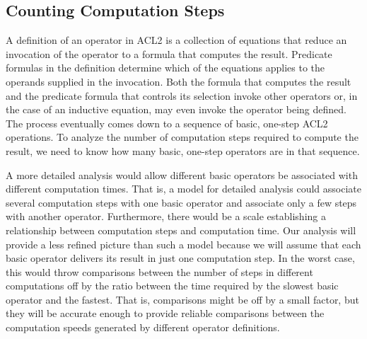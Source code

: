 \subsection{Counting Computation Steps}
\label{subsec:counting-computation-steps}

A definition of an operator in ACL2
is a collection of equations that
reduce an invocation of the operator
to a formula that computes the result.
Predicate formulas in the definition determine
which of the equations applies to
the operands supplied in the invocation.
Both the formula that computes the result and
the predicate formula that controls
its selection invoke other operators
or, in the case of an inductive equation,
may even invoke the operator being defined.
The process eventually comes down to a sequence
of basic, one-step ACL2 operations.
To analyze the number of computation steps
required to compute the result,
we need to know how many basic, one-step operators are
in that sequence.

A more detailed analysis would allow different
basic operators be associated with different computation times.
That is, a model for detailed analysis could associate
several computation steps with one basic operator
and associate only a few steps with another operator.
Furthermore, there
would be a scale establishing a relationship between
computation steps and computation time.
Our analysis will provide a less refined picture than such
a model because we will assume that each basic operator
delivers its result in just one computation step.
In the worst case, this would throw comparisons between
the number of steps in different computations off
by the ratio between the time required by the slowest basic
operator and the fastest. That is, comparisons
might be off by a small factor,
but they will be accurate enough to provide
reliable comparisons between the computation speeds
generated by different operator definitions.

